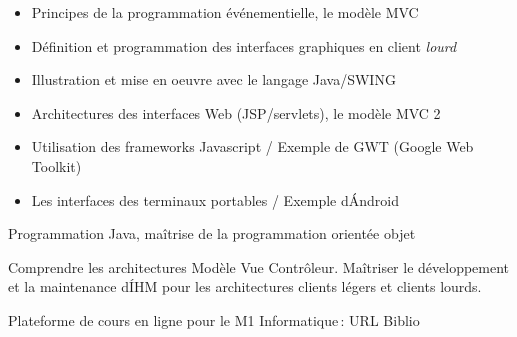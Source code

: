 \vfill

{
\begin{itemize}
\item Principes de la programmation événementielle, le modèle MVC
\item Définition et programmation des interfaces graphiques en client {\it lourd}
\item Illustration et mise en oeuvre avec le langage Java/SWING
\item Architectures des interfaces Web (JSP/servlets), le modèle MVC 2
\item Utilisation des frameworks Javascript / Exemple de GWT (Google Web Toolkit)
\item Les interfaces des terminaux portables / Exemple d\'Android
\end{itemize}
} 
{Programmation Java, maîtrise de la programmation orientée objet 
} 
{\begin{itemize}
\ObjItem Comprendre les architectures Modèle Vue Contrôleur.
\ObjItem Maîtriser le développement et la maintenance d\'IHM pour les architectures clients légers et clients lourds.
\end{itemize} 
} 
{Plateforme de cours en ligne pour le M1 Informatique\,: URL} 
{Biblio} 
 
\vfill

